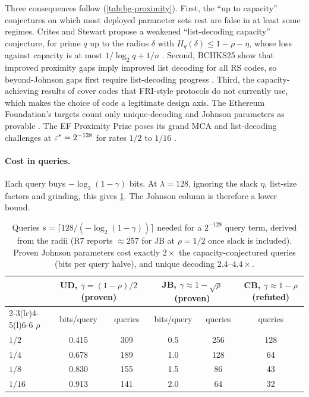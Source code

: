 Three consequences follow (\cref{tab:bg-proximity}). First, the ``up to capacity'' conjectures on
which most deployed parameter sets rest are false in at least some regimes. Crites and Stewart
propose a weakened ``list-decoding capacity'' conjecture, for prime $q$ up to the radius
$\delta$ with $H_q(\delta)\le1-\rho-\eta$, whose loss against capacity is at most
$1/\log_2q+1/n$ \cite{CS25-PGC}. Second, BCHKS25 show that improved proximity
gaps imply improved list decoding for all RS codes, so beyond-Johnson gaps first require
list-decoding progress \cite{BCHKS25}. Third, the capacity-achieving results of \cite{GG25,GGSW26}
cover codes that FRI-style protocols do not currently use, which makes the choice of code a
legitimate design axis. The Ethereum Foundation's targets count only unique-decoding and Johnson
parameters as provable \cite{EF25-zkEVMsec,soundcalc}. The EF Proximity Prize poses its grand MCA
and list-decoding challenges at $\varepsilon^\ast=2^{-128}$ for rates $1/2$ to $1/16$ \cite{ProximityPrize}.

\paragraph{Cost in queries.} Each query buys $-\log_2(1-\gamma)$ bits. At $\lambda=128$, ignoring
the slack $\eta$, list-size factors and grinding, this gives \cref{tab:bg-queries}. The Johnson
column is therefore a lower bound.

\begin{table}[t]
\centering\small
\begin{tabular}{@{}lccccc@{}}
\toprule
& \multicolumn{2}{c}{UD, $\gamma=(1-\rho)/2$ (proven)} & \multicolumn{2}{c}{JB, $\gamma\approx1-\sqrt\rho$ (proven)} & CB, $\gamma\approx1-\rho$ (refuted) \\
\cmidrule(lr){2-3}\cmidrule(lr){4-5}\cmidrule(l){6-6}
$\rho$ & bits/query & queries & bits/query & queries & queries \\
\midrule
$1/2$  & 0.415 & 309 & 0.5 & 256 & 128 \\
$1/4$  & 0.678 & 189 & 1.0 & 128 & 64 \\
$1/8$  & 0.830 & 155 & 1.5 & 86  & 43 \\
$1/16$ & 0.913 & 141 & 2.0 & 64  & 32 \\
\bottomrule
\end{tabular}
\caption{Queries $s=\lceil 128/(-\log_2(1-\gamma))\rceil$ needed for a $2^{-128}$ query term,
derived from the radii (R7 reports $\approx257$ for JB at $\rho=1/2$ once slack is included).
Proven Johnson parameters cost exactly $2\times$ the capacity-conjectured queries (bits per query
halve), and unique decoding $2.4$--$4.4\times$.}
\label{tab:bg-queries}
\end{table}

